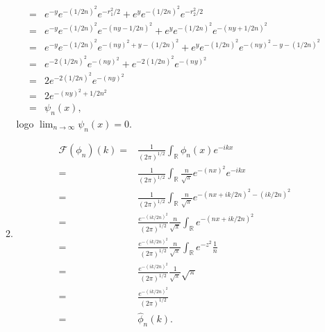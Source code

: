 \documentclass{article}
\begin{document}
\begin{enumerate}
\begin{enumerate}
$$\begin{aligned}
					\\
					= & e^{-y}e^{- (1/2n)^{2}} e^{-r_{1}^{2}/2}+ e^{y}e^{ - (1/2n)^{2}} e^{-r_{2}^{2}/2}
					\\
					= & e^{-y}e^{- (1/2n)^{2}} e^{-(ny-1/2n)^{2}}+ e^{y}e^{ - (1/2n)^{2}} e^{-(ny+1/2n)^{2}}
					\\
					= & e^{-y}e^{- (1/2n)^{2}} e^{-(ny)^{2}+y - (1/2n)^{2}}+ e^{y}e^{ - (1/2n)^{2}}e^{-(ny)^{2}-y - (1/2n)^{2}}
					\\
					= & e^{- 2(1/2n)^{2}} e^{-(ny)^{2}}+ e^{ -2 (1/2n)^{2}}e^{-(ny)^{2}}
					\\
					= & 2e^{- 2(1/2n)^{2}} e^{-(ny)^{2}}
					\\
					= & 2 e^{-(ny)^{2}+  1/2n^{2}}
					\\
					= & \psi_{n}(x),
					\end{aligned}
					$$
					logo $\lim_{n \to \infty} \psi_{n}(x) = 0$.
					
					\item
						$$
						\begin{aligned}
						\mathcal{F}(\phi_{n})(k) = & \frac{1}{(2\pi)^{1/2}}\int_{\mathbb{R}} \phi_{n}(x)e^{-ikx}
						\\
						 = & \frac{1}{(2\pi)^{1/2}}\int_{\mathbb{R}} \frac{n}{\sqrt{\pi}}e^{-(nx)^{2}} e^{-ikx}
						 \\
						 = & \frac{1}{(2\pi)^{1/2}}\int_{\mathbb{R}} \frac{n}{\sqrt{\pi}}e^{-(nx + ik/2n)^{2} - (ik/2n)^{2}}
						 \\
						 = & \frac{e^{-(ik/2n)^{2}}}{(2\pi)^{1/2}} \frac{n}{\sqrt{\pi}} \int_{\mathbb{R}} e^{-(nx + ik/2n)^{2}}
						 \\
						 = & \frac{e^{-(ik/2n)^{2}}}{(2\pi)^{1/2}} \frac{n}{\sqrt{\pi}} \int_{\mathbb{R}} e^{-z^{2}} \frac{1}{n}
						 \\
						 = & \frac{e^{-(ik/2n)^{2}}}{(2\pi)^{1/2}} \frac{1}{\sqrt{\pi}} \sqrt{\pi}
						 \\
						 = & \frac{e^{-(ik/2n)^{2}}}{(2\pi)^{1/2}}
						 \\
						 = & \hat{\phi}_{n}(k).
						\end{aligned}
						$$
			\end{enumerate}
	\end{enumerate}
	
	
\end{document}

